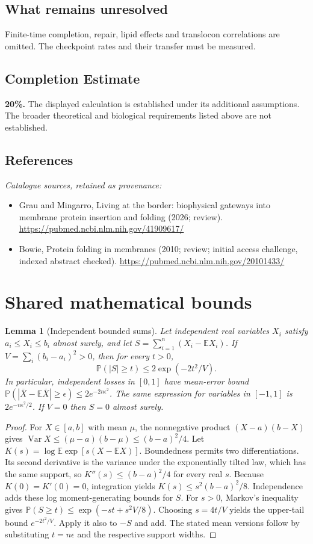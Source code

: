 \documentclass[11pt]{article}
\newcommand{\E}{\mathbb E}
\newcommand{\Prob}{\mathbb P}
\DeclareMathOperator{\Var}{Var}
\providecommand{\E}{\mathbb E}
\providecommand{\Prob}{\mathbb P}
\providecommand{\Var}{\operatorname{Var}}
\newtheorem{sharedlemma}{Lemma}[section]
\begin{document}
\subsection{What remains unresolved}
Finite-time completion, repair, lipid effects and translocon correlations are omitted. The checkpoint rates and their transfer must be measured.
\subsection{Completion Estimate}
\textbf{20\%.} The displayed calculation is established under its additional assumptions. The broader theoretical and biological requirements listed above are not established.
\subsection{References}
\noindent\emph{Catalogue sources, retained as provenance:}
\begin{itemize}
\item Grau and Mingarro, Living at the border: biophysical gateways into membrane protein insertion and folding (2026; review). \url{https://pubmed.ncbi.nlm.nih.gov/41909617/}
\item Bowie, Protein folding in membranes (2010; review; initial access challenge, indexed abstract checked). \url{https://pubmed.ncbi.nlm.nih.gov/20101433/}
\end{itemize}
\clearpage


\appendix
\section{Shared mathematical bounds}\label{app:bounds}
\begin{sharedlemma}[Independent bounded sums]\label{lem:bounded}
Let independent real variables $X_i$ satisfy $a_i\leq X_i\leq b_i$ almost surely,
and let $S=\sum_{i=1}^n(X_i-\E X_i)$. If
$V=\sum_i(b_i-a_i)^2>0$, then for every $t>0$,
\[
 \Prob(|S|\geq t)\leq 2\exp(-2t^2/V).
\]
In particular, independent losses in $[0,1]$ have mean-error bound
$\Prob(|\overline X-\E\overline X|\geq\epsilon)
\leq2e^{-2n\epsilon^2}$. The same expression for variables in $[-1,1]$
is $2e^{-n\epsilon^2/2}$. If $V=0$ then $S=0$ almost surely.
\end{sharedlemma}
\begin{proof}
For $X\in[a,b]$ with mean $\mu$, the nonnegative product
$(X-a)(b-X)$ gives
$\Var X\leq(\mu-a)(b-\mu)\leq(b-a)^2/4$.
Let $K(s)=\log\E\exp[s(X-\E X)]$.
Boundedness permits two differentiations. Its second derivative is the variance
under the exponentially tilted law, which has the same support, so
$K''(s)\leq(b-a)^2/4$ for every real $s$.
Because $K(0)=K'(0)=0$, integration yields
$K(s)\leq s^2(b-a)^2/8$.
Independence adds these log moment-generating bounds for $S$.
For $s>0$, Markov's inequality gives
$\Prob(S\geq t)\leq\exp(-st+s^2V/8)$.
Choosing $s=4t/V$ yields the upper-tail bound $e^{-2t^2/V}$.
Apply it also to $-S$ and add. The stated mean versions follow by substituting
$t=n\epsilon$ and the respective support widths.
\end{proof}
\end{document}
